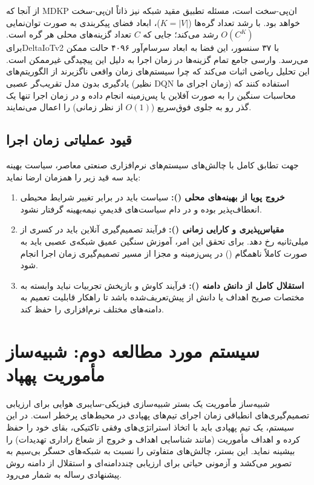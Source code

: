 \documentclass[oneside,openany,phd]{TMU-Thesis}
\begin{document}
از آنجا که MDKP ان‌پی-سخت است، مسئله تطبیق مقید شبکه نیز ذاتاً ان‌پی-سخت خواهد بود. با رشد تعداد گره‌ها ($K = |V|$)، ابعاد فضای پیکربندی به صورت توان‌نمایی $O(C^K)$ رشد می‌کند؛ جایی که $C$ تعداد گزینه‌های محلی هر گره است. برایDeltaIoTv2 با ۳۷ سنسور، این فضا به ابعاد سرسام‌آور ۴۰۹۶ حالت ممکن می‌رسد. وارسی جامع تمام گزینه‌ها در زمان اجرا به دلیل این پیچیدگی غیرممکن است. این تحلیل ریاضی اثبات می‌کند که چرا سیستم‌های زمان واقعی ناگزیرند از الگوریتم‌های یادگیری بدون مدل تقریب‌گر عصبی (نظیر DQN زمان اجرای ما) استفاده کنند که محاسبات سنگین را به صورت آفلاین یا پس‌زمینه انجام داده و در زمان اجرا تنها یک گذر رو به جلوی فوق‌سریع ($O(1)$ از نظر زمانی) را اعمال می‌نمایند.

\subsection{قیود عملیاتی زمان اجرا}

جهت تطابق کامل با چالش‌های سیستم‌های نرم‌افزاری صنعتی معاصر، سیاست بهینه باید سه قید زیر را همزمان ارضا نماید:
\begin{enumerate}
    \item \textbf{خروج پویا از بهینه‌های محلی ():} سیاست باید در برابر تغییر شرایط محیطی انعطاف‌پذیر بوده و در دام سیاست‌های قدیمیِ نیمه‌بهینه گرفتار نشود.
    \item \textbf{مقیاس‌پذیری و کارایی زمانی ():} فرآیند تصمیم‌گیری آنلاین باید در کسری از میلی‌ثانیه رخ دهد. برای تحقق این امر، آموزش سنگین عمیق شبکه‌ی عصبی باید به صورت کاملاً ناهمگام () در پس‌زمینه و مجزا از مسیر تصمیم‌گیری زمان اجرا انجام شود.
    \item \textbf{استقلال کامل از دانش دامنه ():} فرآیند کاوش و بازپخش تجربیات نباید وابسته به مختصات صریح اهداف یا دانش از پیش‌تعریف‌شده باشد تا راهکار قابلیت تعمیم به دامنه‌های مختلف نرم‌افزاری را حفظ کند.
\end{enumerate}

\section{سیستم مورد مطالعه دوم: شبیه‌ساز مأموریت پهپاد }
\label{sec:study_case_dartsim}

شبیه‌ساز مأموریت  \cite{MorenoDART2019} یک بستر شبیه‌سازی فیزیکی-سایبری هوایی برای ارزیابی تصمیم‌گیری‌های انطباقی زمان اجرای تیم‌های پهپادی در محیط‌های پرخطر است. در این سیستم، یک تیم پهپادی باید با اتخاذ استراتژی‌های وفقی تاکتیکی، بقای خود را حفظ کرده و اهداف مأموریت (مانند شناسایی اهداف و خروج از شعاع راداری تهدیدات) را بیشینه نماید. این بستر، چالش‌های متفاوتی را نسبت به شبکه‌های حسگر بی‌سیم به تصویر می‌کشد و آزمونی حیاتی برای ارزیابی چنددامنه‌ای و استقلال از دامنه روش پیشنهادی رساله به شمار می‌رود.
\end{document}
